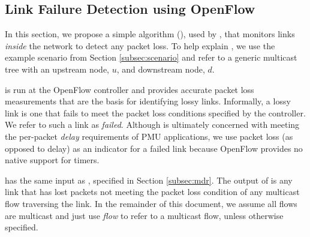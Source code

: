 



























\subsection{Link Failure Detection using OpenFlow}
\label{subsec:detection}


In this section, we propose a simple algorithm (\fls), used by \mdrs, that monitors links \emph{inside} the network to detect any packet loss.  To help explain \fls,
we use the example scenario from Section \ref{subsec:scenario} and refer to a generic multicast tree with an upstream node, $u$, and downstream node, $d$.

\fl is run at the OpenFlow controller and provides accurate packet loss measurements that are the basis for identifying lossy links.
Informally, a lossy link is one that fails to meet the packet loss conditions specified by the controller.  We refer to such a link as \emph{failed}.
Although \mdr is ultimately concerned with meeting the per-packet \emph{delay} requirements of PMU applications, 
we use  packet loss (as opposed to delay) as an indicator for a failed link because OpenFlow provides no native support for timers.

\fl has the same input as \mdrs, specified in Section \ref{subsec:mdr}.
The output of \fl is any link that has lost packets not meeting the packet loss condition of any multicast flow traversing the link. 
In the remainder of this document, we assume all flows are multicast and just use \emph{flow} to refer to a multicast flow, unless otherwise specified.

